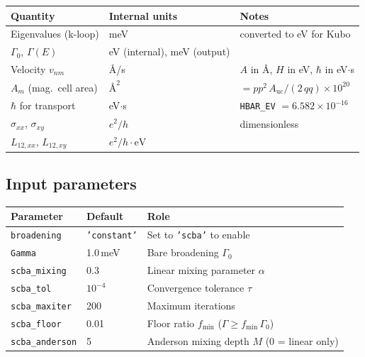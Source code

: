 \documentclass[11pt]{article}
\newcommand{\Gam}{\Gamma}
\newcommand{\Ang}{\text{\AA}}
\begin{document}
\begin{center}
\begin{tabular}{lll}
  \hline
  Quantity & Internal units & Notes \\
  \hline
  Eigenvalues (k-loop) & meV & converted to eV for Kubo \\
  $\Gam_0$, $\Gam(E)$ & eV (internal), meV (output) & \\
  Velocity $v_{nm}$ & $\Ang$/s & $A$ in $\Ang$, $H$ in eV, $\hbar$ in eV$\cdot$s \\
  $A_m$ (mag.\ cell area) & $\Ang^2$ & $= pp^2\, A_{\mathrm{uc}} / (2\,qq) \times 10^{20}$ \\
  $\hbar$ for transport & eV$\cdot$s & \texttt{HBAR\_EV} $= 6.582 \times 10^{-16}$ \\
  $\sigma_{xx}$, $\sigma_{xy}$ & $e^2/h$ & dimensionless \\
  $L_{12,xx}$, $L_{12,xy}$ & $e^2/h \cdot \mathrm{eV}$ & \\
  \hline
\end{tabular}
\end{center}

\subsection{Input parameters}

\begin{center}
\begin{tabular}{llp{7cm}}
  \hline
  Parameter & Default & Role \\
  \hline
  \texttt{broadening} & \texttt{'constant'} & Set to \texttt{'scba'} to enable \\
  \texttt{Gamma} & 1.0\,meV & Bare broadening $\Gam_0$ \\
  \texttt{scba\_mixing} & 0.3 & Linear mixing parameter $\alpha$ \\
  \texttt{scba\_tol} & $10^{-4}$ & Convergence tolerance $\tau$ \\
  \texttt{scba\_maxiter} & 200 & Maximum iterations \\
  \texttt{scba\_floor} & 0.01 & Floor ratio $f_{\min}$ ($\Gam \ge f_{\min}\,\Gam_0$) \\
  \texttt{scba\_anderson} & 5 & Anderson mixing depth $M$ (0 = linear only) \\
  \hline
\end{tabular}
\end{center}

\end{document}
